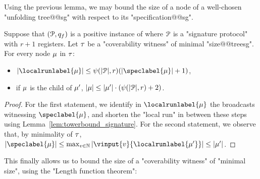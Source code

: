
Using the previous lemma, we may bound the size of a node of a well-chosen "unfolding tree@@sg" with respect to its "specification@@sg".

\begin{lemma}
\label{lem:bounds_tree_sg}
Suppose that $(\mathcal{P}, q_f)$ is a positive instance of \COVER where $\mathcal{P}$ is a "signature protocol" with $r+1$ registers. Let $\tau$ be a "coverability witness" of minimal "size@@treesg".
For every node $\mu$ in $\tau$: \begin{itemize}
\item $\size{\localrunlabel{\node}} \leq \towerfun(\size{\prot}, r) (\size{\speclabel{\node}}+1)$,
\item if $\mu$ is the child of $\mu'$, $|\mu| \leq |\mu'| \cdot (\psi(|\mathcal{P}|,r)+2)$.
\end{itemize} 
\end{lemma}
\begin{proof}
For the first statement, we identify in $\localrunlabel{\node}$ the broadcasts witnessing $\speclabel{\node}$, and shorten the "local run" in between these steps using Lemma~\ref{lem:towerbound_signature}.
For the second statement, we observe that, by minimality of $\tau$, $\size{\speclabel{\node}} \leq \max_{v \in \nats} \size{\vinput{v}{\localrunlabel{\node'}}} \leq \size{\node'}$.  
\end{proof}

This finally allows us to bound the size of a "coverability witness" of "minimal size", using the "Length function theorem":

